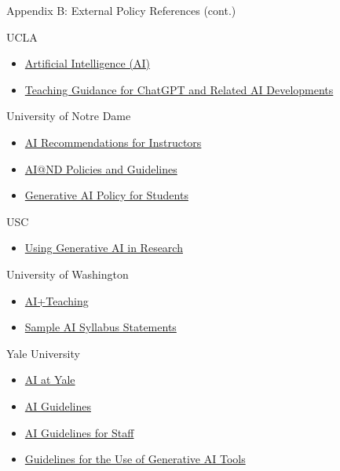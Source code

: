 \documentclass[aspectratio=169]{beamer}
\begin{document}
\begin{frame}[t]{Appendix B: External Policy References (cont.)}

\tiny

UCLA
\begin{itemize}
  \item \href{https://dts.ucla.edu/initiatives/ai}{Artificial Intelligence (AI)}
  \item \href{https://senate.ucla.edu/news/teaching-guidance-chatgpt-and-related-ai-developments}{Teaching Guidance for ChatGPT and Related AI Developments}
\end{itemize}

University of Notre Dame
\begin{itemize}
  \item \href{https://honorcode.nd.edu/ai-recommendations-for-instructors/}{AI Recommendations for Instructors}
  \item \href{https://ai.nd.edu/policies-and-guidelines/}{AI@ND Policies and Guidelines}
  \item \href{https://honorcode.nd.edu/generative-ai-policy-for-students-august-2023/}{Generative AI Policy for Students}
\end{itemize}

USC
\begin{itemize}
\item \href{https://libguides.usc.edu/generative-AI/home}{Using Generative AI in Research}
\end{itemize}

University of Washington
\begin{itemize}
  \item \href{https://teaching.washington.edu/course-design/ai/}{AI+Teaching}
  \item \href{https://teaching.washington.edu/course-design/ai/sample-ai-syllabus-statements/}{Sample AI Syllabus Statements}
\end{itemize}

Yale University
\begin{itemize}
  \item \href{https://ai.yale.edu/}{AI at Yale}
  \item \href{https://poorvucenter.yale.edu/AIguidance}{AI Guidelines}
  \item \href{https://yaledata.yale.edu/yale-university-ai-guidelines-staff}{AI Guidelines for Staff}
  \item \href{https://provost.yale.edu/news/guidelines-use-generative-ai-tools}{Guidelines for the Use of Generative AI Tools}
\end{itemize}

\end{frame}
\end{document}
